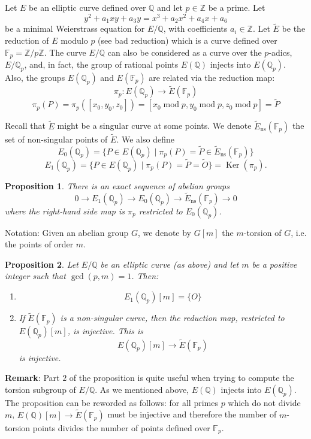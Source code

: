 \documentclass[12pt]{article}
\newtheorem{prop}{Proposition}
\newcommand{\Ints}{\mathbb{Z}}
\newcommand{\Rats}{\mathbb{Q}}
\begin{document}
Let $E$ be an elliptic curve defined over $\Rats$ and let
$p\in\Ints$ be a prime. Let
$$y^2+a_1xy+a_3y=x^3+a_2x^2+a_4x+a_6$$
be a minimal Weierstrass equation for $E/\Rats$, 
with coefficients $a_i\in\Ints$. Let $\widetilde{E}$ be the reduction
of $E$ modulo $p$ (see bad reduction) which is a curve defined
over $\mathbb{F}_p=\Ints/p\Ints$. The curve $E/\Rats$ can also be considered as a curve over the $p$-adics, $E/\Rats_p$,  and, in fact, the group of rational points $E(\Rats)$ injects into $E(\Rats_p)$. Also, the groups $E(\Rats_p)$ and $E(\mathbb{F}_p)$ are related via the reduction
map:
$$\pi_p \colon E(\Rats_p) \to \widetilde{E}(\mathbb{F}_p)$$
$$\pi_p(P)=\pi_p([x_0,y_0,z_0])=[x_0 \operatorname{mod} p,y_0 \operatorname{mod} p,z_0\operatorname{mod} p]=\widetilde{P}$$

Recall that $\widetilde{E}$ might be a singular curve at some
points. We denote
$\widetilde{E}_{\operatorname{ns}}(\mathbb{F}_p)$ the set of
non-singular points of $\widetilde{E}$. We also define
$$E_0(\Rats_p)=\{ P\in E(\Rats_p) \mid \pi_p(P)=\widetilde{P}\in
\widetilde{E}_{\operatorname{ns}}(\mathbb{F}_p)\}$$
$$E_1(\Rats_p)=\{ P\in E(\Rats_p) \mid
\pi_p(P)=\widetilde{P}=\widetilde{O}\}=
\operatorname{Ker}(\pi_p).$$

\begin{prop}
There is an exact sequence of abelian groups
$$0\longrightarrow
E_1(\Rats_p)\longrightarrow E_0(\Rats_p)\longrightarrow
\widetilde{E}_{\operatorname{ns}}(\mathbb{F}_p)\longrightarrow 0
$$
where the right-hand side map is $\pi_p$ restricted to
$E_0(\Rats_p)$.
\end{prop}

Notation: Given an abelian group $G$, we denote by $G[m]$ the $m$-torsion
of $G$, i.e. the points of order $m$.

\begin{prop}
Let $E/\Rats$ be an elliptic curve (as above) and let $m$ be a
positive integer such that $\gcd(p,m)=1$. Then:
\begin{enumerate}
\item $$E_1(\Rats_p)[m]=\{ O \}$$ \item If
$\widetilde{E}(\mathbb{F}_p)$ is a non-singular curve, then the
reduction map, restricted to $E(\Rats_p)[m]$, is injective. This is
$$E(\Rats_p)[m] \longrightarrow \widetilde{E}(\mathbb{F}_p)$$
is injective.
\end{enumerate}
\end{prop}

{\bf Remark}: Part $2$ of the proposition is quite useful when
trying to compute the torsion subgroup of $E/\Rats$. As we mentioned above, $E(\Rats)$ injects into $E(\Rats_p)$. The proposition can be reworded as follows: for all primes $p$ which do not
divide $m$, $E(\Rats)[m] \longrightarrow
\widetilde{E}(\mathbb{F}_p)$ must be injective and therefore the
number of $m$-torsion points divides the number of points defined
over $\mathbb{F}_p$.
\end{document}
